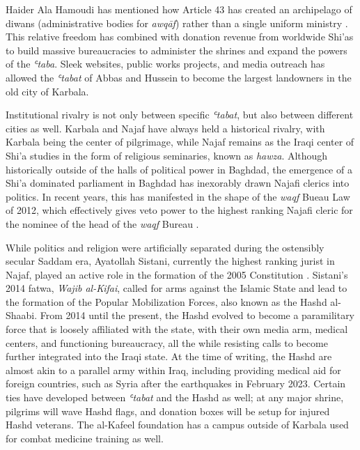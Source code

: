 Haider Ala Hamoudi has mentioned how Article 43 has created an archipelago of diwans (administrative bodies for \emph{awqāf}) rather than a single uniform ministry \cite[220]{hamoudi_engagements_2020}. This relative freedom has combined with donation revenue from worldwide Shi'as to build massive bureaucracies to administer the shrines and expand the powers of the \emph{ʿtaba}. Sleek websites, public works projects, and media outreach has allowed the \emph{ʿtabat} of Abbas and Hussein to become the largest landowners in the old city of Karbala. 

Institutional rivalry is not only between specific \emph{ʿtabat}, but also between different cities as well. Karbala and Najaf have always held a historical rivalry, with Karbala being the center of pilgrimage, while Najaf remains as the Iraqi center of Shi'a studies in the form of religious seminaries, known as \emph{hawza}. Although historically outside of the halls of political power in Baghdad, the emergence of a Shi'a dominated parliament in Baghdad has inexorably drawn Najafi clerics into politics. In recent years, this has manifested in the shape of the \emph{waqf} Bueau Law of 2012, which effectively gives veto power to the highest ranking Najafi cleric for the nominee of the head of the \emph{waqf} Bureau \cite{hamoudi_engagements_2020}.


While politics and religion were artificially separated during the ostensibly secular Saddam era, Ayatollah Sistani, currently the highest ranking jurist in Najaf, played an active role in the formation of the 2005 Constitution \cite[146]{nakash_reaching_2006}. Sistani's 2014 fatwa, \emph{Wajib al-Kifai}, called for arms against the Islamic State and lead to the formation of the Popular Mobilization Forces, also known as the Hashd al-Shaabi. From 2014 until the present, the Hashd evolved to become a paramilitary force that is loosely affiliated with the state, with their own media arm, medical centers, and functioning bureaucracy, all the while resisting calls to become further integrated into the Iraqi state. At the time of writing, the Hashd are almost akin to a parallel army within Iraq, including providing medical aid for foreign countries, such as Syria after the earthquakes in February 2023. Certain ties have developed between \emph{ʿtabat} and the Hashd as well; at any major shrine, pilgrims will wave Hashd flags, and donation boxes will be setup for injured Hashd veterans. The al-Kafeel foundation has a campus outside of Karbala used for combat medicine training as well. 

